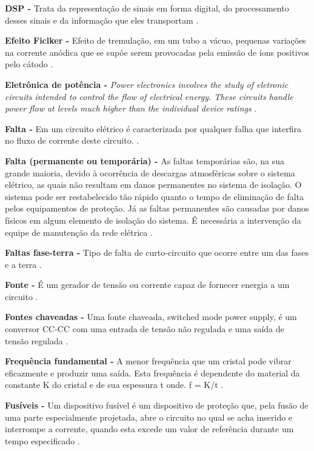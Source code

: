 \noindent
\textbf{DSP -} Trata da representação de sinais em forma digital, do processamento desses sinais e da informação que eles transportam \citep{HAD99}.

\noindent
\textbf{Efeito Ficlker -} Efeito de tremulação, em um tubo a vácuo, pequenas variações na corrente anódica que se supõe serem provocadas pela emissão de íons positivos pelo cátodo \citep{GAR82}.

\noindent
\textbf{Eletrônica de potência -} \textit{Power electronics involves the study of eletronic circuits intended to control the flow of electrical energy. These circuits handle power flow at levels much higher than the individual device ratings }\citep{RAS11}. 

\noindent
\textbf{Falta -} Em um circuito elétrico é caracterizada por qualquer falha que interfira no fluxo de corrente deste circuito. \citep{GRA96}.

\noindent
\textbf{Falta (permanente ou temporária) -} As faltas temporárias são, na sua grande maioria, devido à ocorrência de descargas atmosféricas sobre o sistema elétrico, as quais não resultam em danos permanentes no sistema de isolação. O sistema pode ser restabelecido tão rápido quanto o tempo de eliminação de falta pelos equipamentos de proteção. Já as faltas permanentes são causadas por danos físicos em algum elemento de isolação do sistema. É necessária a intervenção da equipe de manutenção da rede elétrica \citep{CAR97}.

\noindent
\textbf{Faltas fase-terra -} Tipo de falta de curto-circuito que ocorre entre um das fases e a terra \citep{CAR97}.

\noindent
\textbf{Fonte -} É um gerador de tensão ou corrente capaz de fornecer energia a um circuito \citep{DOR08}.

\noindent
\textbf{Fontes chaveadas -} Uma fonte chaveada, switched mode power supply, é um conversor CC-CC com uma entrada de tensão não regulada e uma saída de tensão regulada \citep{FIN02}.

\noindent
\textbf{Frequência fundamental -} A menor frequência que um cristal pode vibrar eficazmente e produzir uma saída. Esta frequência é dependente do material da constante K do cristal e de sua espessura t onde. f = K/t \citep{MAL07}.

\noindent
\textbf{Fusíveis -} Um dispositivo fusível é um dispositivo de proteção que, pela fusão de uma parte especialmente projetada, abre o circuito no qual se acha inserido e interrompe a corrente, quando esta excede um valor de referência durante um tempo especificado \citep{COR05}.

